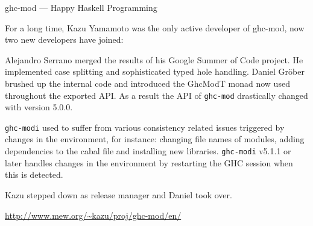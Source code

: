 \begin{hcarentry}[updated]{ghc-mod --- Happy Haskell Programming}
\makeheader

For a long time, Kazu Yamamoto was the only active developer of ghc-mod, now two
new developers have joined:

Alejandro Serrano merged the results of his Google Summer of Code project. He
implemented case splitting and sophisticated typed hole handling.  Daniel Gröber
brushed up the internal code and introduced the GhcModT monad now used
throughout the exported API. As a result the API of \texttt{ghc-mod} drastically
changed with version 5.0.0.

\texttt{ghc-modi} used to suffer from various consistency related issues
triggered by changes in the environment, for instance: changing file names of
modules, adding dependencies to the cabal file and installing new libraries.
\texttt{ghc-modi} v5.1.1 or later handles changes in the environment by
restarting the GHC session when this is detected.

Kazu stepped down as release manager and Daniel took over.

\FurtherReading
  \url{http://www.mew.org/~kazu/proj/ghc-mod/en/}
\end{hcarentry}
